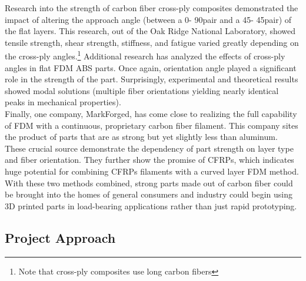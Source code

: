 Research into the strength of carbon fiber cross-ply composites demonstrated the impact of altering the approach angle (between a 0\degree - 90\degree pair and a 45\degree - 45\degree pair) of the flat layers. This research, out of the Oak Ridge National Laboratory, showed tensile strength, shear strength, stiffness, and fatigue varied greatly depending on the cross-ply angles.\footnote{Note that cross-ply composites use long carbon fibers}\cite{ornl} Additional research has analyzed the effects of cross-ply angles \cite{cantilever} in flat FDM ABS parts. Once again, orientation angle played a significant role in the strength of the part. Surprisingly, experimental and theoretical results showed modal solutions (multiple fiber orientations yielding nearly identical peaks in mechanical properties).\\

Finally, one company, MarkForged\cite{markforged}, has come close to realizing the full capability of FDM with a continuous, proprietary carbon fiber filament. This company sites the product of parts that are as strong but yet slightly less than aluminum.\\

These crucial source demonstrate the dependency of part strength on layer type and fiber orientation. They further show the promise of CFRPs, which indicates huge potential for combining CFRPs filaments with a curved layer FDM method. With these two methods combined, strong parts made out of carbon fiber could be brought into the homes of general consumers and industry could begin using 3D printed parts in load-bearing applications rather than just rapid prototyping.\\

\subsection{Project Approach}

\indent

